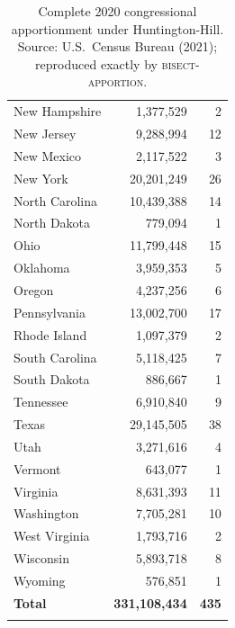 \begin{longtable}{lrr}
New Hampshire  & 1,377,529  & 2 \\
New Jersey     & 9,288,994  & 12 \\
New Mexico     & 2,117,522  & 3 \\
New York       & 20,201,249 & 26 \\
North Carolina & 10,439,388 & 14 \\
North Dakota   & 779,094    & 1 \\
Ohio           & 11,799,448 & 15 \\
Oklahoma       & 3,959,353  & 5 \\
Oregon         & 4,237,256  & 6 \\
Pennsylvania   & 13,002,700 & 17 \\
Rhode Island   & 1,097,379  & 2 \\
South Carolina & 5,118,425  & 7 \\
South Dakota   & 886,667    & 1 \\
Tennessee      & 6,910,840  & 9 \\
Texas          & 29,145,505 & 38 \\
Utah           & 3,271,616  & 4 \\
Vermont        & 643,077    & 1 \\
Virginia       & 8,631,393  & 11 \\
Washington     & 7,705,281  & 10 \\
West Virginia  & 1,793,716  & 2 \\
Wisconsin      & 5,893,718  & 8 \\
Wyoming        & 576,851    & 1 \\
\midrule
\textbf{Total} & \textbf{331,108,434} & \textbf{435} \\
\bottomrule
\caption{Complete 2020 congressional apportionment under Huntington-Hill.
  Source: U.S.\ Census Bureau (2021); reproduced exactly by
  \textsc{bisect-apportion}.}
\label{tab:full-apportionment}
\end{longtable}
